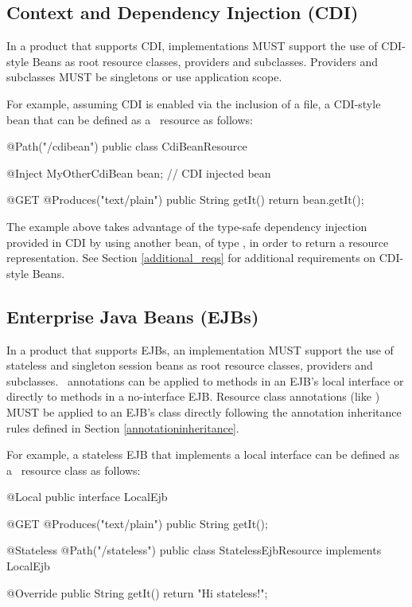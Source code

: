 \subsection{Context and Dependency Injection (CDI)}
\label{cdi}
In a product that supports CDI, implementations MUST support the use of CDI-style Beans as root resource classes, providers and  subclasses. Providers and  subclasses MUST be singletons or use application scope. 

For example, assuming CDI is enabled via the inclusion of a  file, a CDI-style bean that can be defined as a \jaxrs\ resource as follows:

\begin{listing}{1}
@Path("/cdibean")
public class CdiBeanResource {

	@Inject MyOtherCdiBean bean;		// CDI injected bean

    @GET
    @Produces("text/plain")
    public String getIt() {
        return bean.getIt();
    }
}
\end{listing}

The example above takes advantage of the type-safe dependency injection provided in CDI by using another bean, of type , in order to return a resource representation. See Section \ref{additional_reqs} for additional requirements on CDI-style Beans.

\subsection{Enterprise Java Beans (EJBs)}
\label{ejbs}

In a product that supports EJBs, an implementation MUST support the use of stateless and singleton session beans as root resource classes, providers and  subclasses. 
\jaxrs\ annotations can be applied to methods in an EJB's local interface or directly to methods in a no-interface EJB. Resource class annotations (like \Path) MUST be applied to an EJB's class directly following the annotation inheritance rules defined in Section \ref{annotationinheritance}.

For example, a stateless EJB that implements a local interface can be defined as a \jaxrs\ resource class as follows:

\begin{listing}{1}
@Local
public interface LocalEjb {

    @GET
    @Produces("text/plain")
    public String getIt();
}

@Stateless
@Path("/stateless")
public class StatelessEjbResource implements LocalEjb {

    @Override
    public String getIt() {
        return "Hi stateless!";
    }
}
\end{listing}

